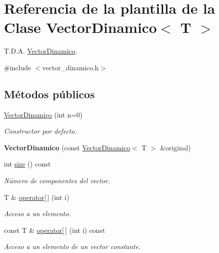 \hypertarget{classVectorDinamico}{}\section{Referencia de la plantilla de la Clase Vector\+Dinamico$<$ T $>$}
\label{classVectorDinamico}


T.\+D.\+A. \hyperlink{classVectorDinamico}{Vector\+Dinamico}.  




{\ttfamily \#include $<$vector\+\_\+dinamico.\+h$>$}

\subsection*{Métodos públicos}
\begin{DoxyCompactItemize}
\item 
\hyperlink{classVectorDinamico_ad1d9b40e76d3ac449e99da4290e08924}{Vector\+Dinamico} (int n=0)
\begin{DoxyCompactList}\small\item\em Constructor por defecto. \end{DoxyCompactList}\item 
\mbox{\label{classVectorDinamico_a32117d987800176b81b5b288a15fa80e}} 
{\bfseries Vector\+Dinamico} (const \hyperlink{classVectorDinamico}{Vector\+Dinamico}$<$ T $>$ \&original)
\item 
int \hyperlink{classVectorDinamico_a170abdfac52375020f44bc3903f23b65}{size} () const
\begin{DoxyCompactList}\small\item\em Número de componentes del vector. \end{DoxyCompactList}\item 
T \& \hyperlink{classVectorDinamico_a6c4cab2d396b71939c056fb40ba72951}{operator\mbox{[}$\,$\mbox{]}} (int i)
\begin{DoxyCompactList}\small\item\em Acceso a un elemento. \end{DoxyCompactList}\item 
const T \& \hyperlink{classVectorDinamico_ad078d3fb05f126632fd8fe995fae2a74}{operator\mbox{[}$\,$\mbox{]}} (int i) const
\begin{DoxyCompactList}\small\item\em Acceso a un elemento de un vector constante. \end{DoxyCompactList}\item 

\end{DoxyCompactItemize}
